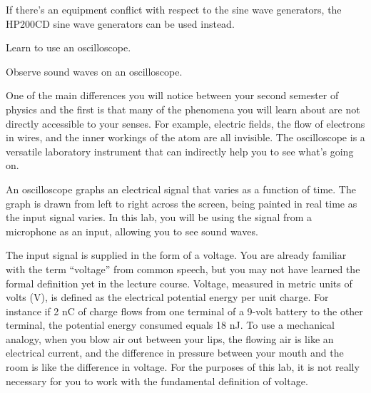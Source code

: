\label{lab:oscilloscope}

\apparatus
{}

If there's an equipment conflict with respect to the sine wave
generators, the HP200CD sine wave generators can be used instead.

\begin{goals}

\item[] Learn to use an oscilloscope.

\item[] Observe sound waves on an oscilloscope.
\end{goals}

\introduction

One of the main differences you will notice between your
second semester of physics and the first is that many of the
phenomena you will learn about are not directly accessible
to your senses. For example, electric fields, the flow of
electrons in wires, and the inner workings of the atom are
all invisible.  The oscilloscope is a versatile laboratory
instrument that can indirectly help you to see what's going on. 


An oscilloscope graphs an electrical signal that varies as
a function of time.
The graph is drawn from left to right across the screen,
being painted in real time as the input signal varies.
In this lab, you
will be using the signal from a microphone as an input,
allowing you to see sound waves. 

The input signal is
supplied in the form of a voltage.
You are already familiar with the term ``voltage'' from
common speech, but you may not have learned the formal
definition yet in the lecture course. Voltage, measured in
metric units of volts (V), is defined as the electrical
potential energy per unit charge. For instance if 2 nC of
charge flows from one terminal of a 9-volt battery to the
other terminal, the potential energy consumed equals 18 nJ.
To use a mechanical analogy, when you blow air out between
your lips, the flowing air is like an electrical current,
and the difference in pressure between your mouth and the
room is like the difference in voltage. For the purposes of
this lab, it is not really necessary for you to work with
the fundamental definition of voltage.

